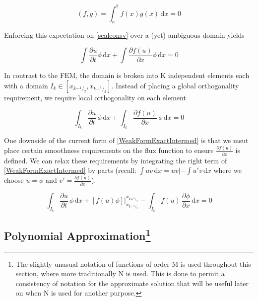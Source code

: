 \documentclass[letterpaper]{article}
\begin{document}
\begin{equation}\label{innerprod}
(f,g) = \int_a^b \! f(x)g(x) \, \mathrm{d}x = 0
\end{equation}

Enforcing this expectation on \eqref{scalconsv} over a (yet) ambiguous domain yields

\begin{equation}\label{WeakFormGlobal}
\int\! \frac{\partial u}{\partial t} \phi \,\mathrm{d}x + \int\! \frac{\partial f(u)}{\partial x} \phi \,\mathrm{d}x = 0
\end{equation}

In contrast to the FEM, the domain is broken into K independent elements each with a domain $I_k \in [x_{k-^1\!/_2},x_{k+^1\!/_2}]$. Instead of placing a global orthoganality requirement, we require local orthogonality on each element

\begin{equation}\label{WeakFormExactIntermed}
\int_{I_k}\! \frac{\partial u}{\partial t} \,\phi \,\mathrm{d}x + \int_{I_k}\! \frac{\partial f(u)}{\partial x} \,\phi \,\mathrm{d}x = 0
\end{equation}

One downside of the current form of \eqref{WeakFormExactIntermed} is that we msut place certain smoothness requirements on the flux function to ensure $\frac{\partial f(u)}{\partial x}$ is defined. We can relax these requirements by integrating the right term of \eqref{WeakFormExactIntermed} by parts (recall: $\int uv \,\mathrm{d}x = uv| - \int u'v \,\mathrm{d}x$ where we choose $u=\phi$ and $v'=\frac{\partial f(u)}{\partial x}$).

\begin{equation}\label{WeakFormExact}
\int_{I_k}\! \frac{\partial u}{\partial t} \,\phi \,\mathrm{d}x + [f(u)\phi] \Big\rvert_{x_{k-^1\!/_2}}^{x_{k+^1\!/_2}} -  \int_{I_k}\! f(u) \,\frac{\partial \phi}{\partial x} \,\mathrm{d}x = 0
\end{equation}

\subsection[Polynomial Approximation] {Polynomial Approximation\footnote{The slightly unusual notation of functions of order M is used throughout this section, where more traditionally N is used. This is done to permit a consistency of notation for the approximate solution that will be useful later on when N is used for another purpose.} }
\end{document}
